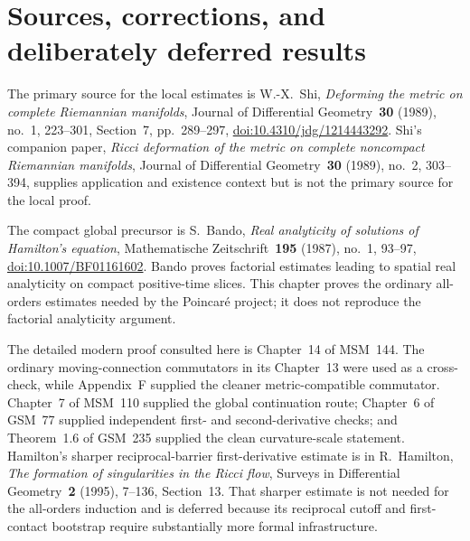 \documentclass[10pt]{coll-l}
\theoremstyle{definition}
\theoremstyle{remark}
\numberwithin{section}{chapter}
\numberwithin{equation}{chapter}
\begin{document}
\section{Sources, corrections, and deliberately deferred results}
\label{sec:shi-sources}

The primary source for the local estimates is W.-X.~Shi,
\emph{Deforming the metric on complete Riemannian manifolds}, Journal of
Differential Geometry~\textbf{30} (1989), no.~1, 223--301,
Section~7, pp.~289--297,
\href{https://doi.org/10.4310/jdg/1214443292}{doi:10.4310/jdg/1214443292}.
Shi's companion paper, \emph{Ricci deformation of the metric on complete
noncompact Riemannian manifolds}, Journal of Differential
Geometry~\textbf{30} (1989), no.~2, 303--394, supplies application and
existence context but is not the primary source for the local proof.

The compact global precursor is S.~Bando,
\emph{Real analyticity of solutions of Hamilton's equation},
Mathematische Zeitschrift~\textbf{195} (1987), no.~1, 93--97,
\href{https://doi.org/10.1007/BF01161602}{doi:10.1007/BF01161602}.
Bando proves factorial estimates leading to spatial real analyticity on
compact positive-time slices.  This chapter proves the ordinary all-orders
estimates needed by the Poincar\'e project; it does not reproduce the
factorial analyticity argument.

The detailed modern proof consulted here is Chapter~14 of MSM~144.  The
ordinary moving-connection commutators in its Chapter~13 were used as a
cross-check, while Appendix~F supplied the cleaner metric-compatible
commutator.  Chapter~7 of MSM~110 supplied the global continuation route;
Chapter~6 of GSM~77 supplied independent first- and second-derivative
checks; and Theorem~1.6 of GSM~235 supplied the clean curvature-scale
statement.  Hamilton's sharper reciprocal-barrier first-derivative estimate
is in R.~Hamilton, \emph{The formation of singularities in the Ricci flow},
Surveys in Differential Geometry~\textbf{2} (1995), 7--136, Section~13.
That sharper estimate is not needed for the all-orders induction and is
deferred because its reciprocal cutoff and first-contact bootstrap require
substantially more formal infrastructure.
\end{document}
